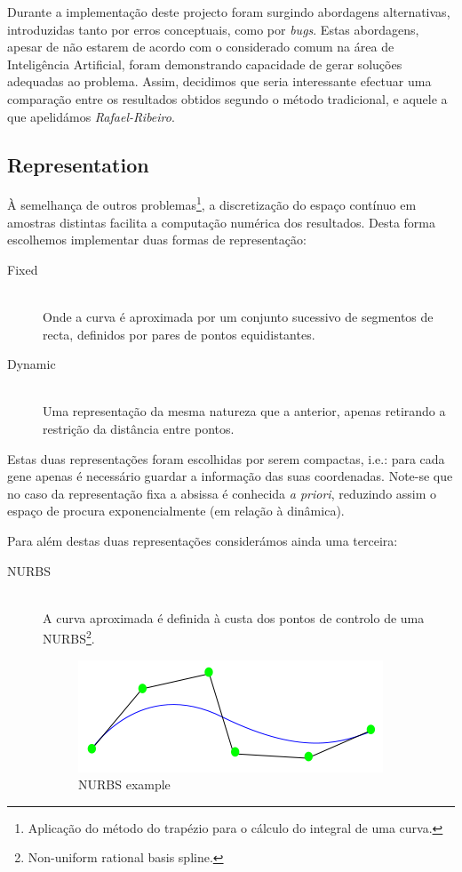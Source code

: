 \documentclass[a4paper]{article}
\begin{document}
\indent Durante a implementação deste projecto foram surgindo abordagens alternativas,
introduzidas tanto por erros conceptuais, como por \emph{bugs}. Estas abordagens, apesar de não estarem de acordo com
o considerado comum na área de Inteligência Artificial, foram demonstrando capacidade de gerar soluções adequadas ao problema.
Assim, decidimos que seria interessante efectuar uma comparação entre os resultados obtidos segundo o método tradicional, e aquele a que apelidámos \emph{Rafael-Ribeiro}. 

\cleardoublepage
\subsection{Representation}
\label{subsec:representation}
\indent \indent À semelhança de outros problemas\footnote[1]{Aplicação do método do trapézio para o cálculo do integral de uma curva.}, a discretização do espaço contínuo em amostras
distintas facilita a computação numérica dos resultados. Desta forma escolhemos implementar duas formas de representação:

\begin{description}
	\item[Fixed] \hfill \\
	\label{it:fixed_representation}
		Onde a curva é aproximada por um conjunto sucessivo de segmentos de recta, definidos por pares de pontos equidistantes.
	\item[Dynamic] \hfill \\
	\label{it:dynamic_representation}
		Uma representação da mesma natureza que a anterior, apenas retirando a restrição da distância entre pontos.
\end{description}

\indent Estas duas representações foram escolhidas por serem compactas, i.e.: para cada gene apenas é necessário guardar a informação das suas coordenadas.
Note-se que no caso da representação fixa a absissa é conhecida \emph{a priori}, reduzindo assim o espaço de procura exponencialmente (em relação à dinâmica).

\indent Para além destas duas representações considerámos ainda uma terceira:

\begin{description}
	\item[NURBS] \hfill \\ 
		A curva aproximada é definida à custa dos pontos de controlo de uma NURBS\footnote[2]{Non-uniform rational basis spline.}. 
		\begin{figure}[ht]
			\centering
			\includegraphics[scale=0.50]{images/NURBstatic.png}
			\caption{NURBS example}
			\label{fig:nurbs}
		\end{figure}
\end{description}
\end{document}
